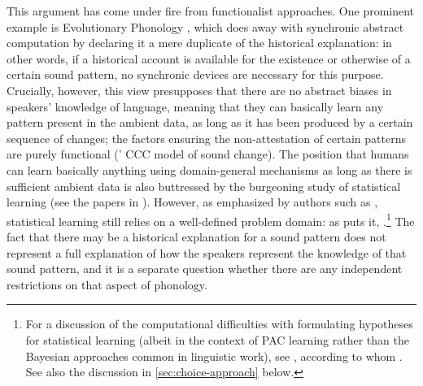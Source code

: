 This argument has come under fire from functionalist approaches. One prominent example is Evolutionary Phonology \citep{blevins,blevins06:_evolut_phonol}, which does away with synchronic abstract computation by declaring it a mere duplicate of the historical explanation: in other words, if a historical account is available for the existence or otherwise of a certain sound pattern, no synchronic devices are necessary for this purpose. Crucially, however, this view presupposes that there are no abstract biases in speakers' knowledge of language, meaning that they can basically learn any pattern present in the ambient data, as long as it has been produced by a certain sequence of changes; the factors ensuring the non\hyp attestation of certain patterns are purely functional (\citeauthor{blevins}' CCC model of sound change). The position that humans can learn basically anything using domain\hyp general mechanisms as long as there is sufficient ambient data is also buttressed by the burgeoning study of statistical learning (see \eg the papers in \citealt{bod03:_probab}). However, as emphasized by authors such as \citet[\eg][]{yang02:_knowl,yang04:_univer_gramm}, statistical learning still relies on a well\hyp defined problem domain: as \citet[p.~452]{yang04:_univer_gramm} puts it, .\footnote{For a discussion of the computational difficulties with formulating hypotheses for statistical learning (albeit in the context of PAC learning rather than the Bayesian approaches common in linguistic work), see \citet[§7.1]{aaronsonng:_why}, according to whom . See also the discussion in  \cref{sec:choice-approach} below.} The fact that there may be a historical explanation for a sound pattern does not represent a full explanation of how the speakers represent the knowledge of that sound pattern, and it is a separate question whether there are any independent restrictions on that aspect of phonology.

